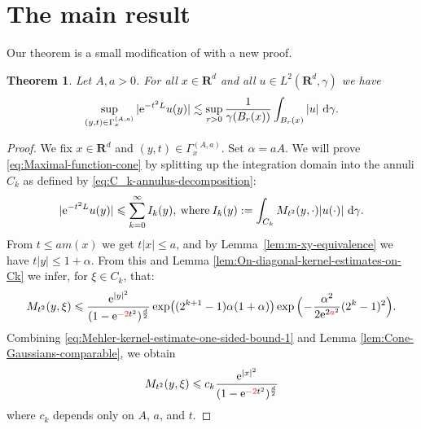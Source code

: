 \documentclass{amsart}
\newtheorem{theorem}{Theorem}
\theoremstyle{remark}
\newcommand{\D}{\,\textup{d}}
\newcommand{\LHG}{{L^2(\R^d,\gamma)}}
\renewcommand{\leq}{\leqslant}
\renewcommand{\leq}{\leqslant}
\newcommand{\R}{\mathbf R}
\newcommand{\e}{\mathrm{e}} %
\renewcommand{\leq}{\leqslant}%
\newcommand{\red}{\color{red}}
\begin{document}
\section{The main result}
Our theorem is a small modification of \cite[lemma 1.1]{Pineda2008} with a new proof.
\begin{theorem}\label{thm:Gaussian-maximal-function}
  Let $A, a > 0$. For all $x\in \R^d$ and all $u \in \LHG$ we have
  \begin{equation}
    \label{eq:Maximal-function-cone}
    \sup_{(y, t) \in \Gamma_x^{(A, a)}} |\e^{-t^2 L} u(y)| \lesssim
    \sup_{r > 0} \frac1{\gamma(B_r(x))}\int_{B_r(x)} |u| \, \D\gamma.
  \end{equation}
\end{theorem}
\begin{proof}
  We fix $x\in \R^d$ and $ (y, t) \in \Gamma_x^{(A, a)}$. 
  Set $\alpha = aA$. 
  We will prove \eqref{eq:Maximal-function-cone} by splitting up the
  integration domain into the annuli $C_k$ as defined by
  \eqref{eq:C_k-annulus-decomposition}: 
  \begin{equation}
    \label{eq:Maximal-function-cone-intermediate-step-1}
    |\e^{-t^2 L} u(y)| \leq \sum_{k = 0}^\infty I_k(y),
    \:\text{where}\: I_k(y) := \int_{C_k} M_{t^2}(y, \cdot) |u(\cdot)|
    \,\D\gamma.
  \end{equation} 
  From $t \leq a m(x)$ we get $t |x| \leq a$, and by
  Lemma~\ref{lem:m-xy-equivalence} we have $t |y| \leq 1 + \alpha$. From this
  and Lemma \ref{lem:On-diagonal-kernel-estimates-on-Ck} we infer, for $\xi\in
  C_k$, that:
  \begin{equation}
    \label{eq:Mehler-kernel-estimate-one-sided-bound-1}
    M_{t^2}(y, \xi) \leq  \frac{\e^{|y|^2}}{(1 -
      \e^{-{\red 2}{t^2}})^{\frac{d}2}} \exp\bigl((2^{k + 1} - 1) \alpha (1 + \alpha) \bigr)
    \exp\Big(\!-\!\frac{\alpha^2}{2 \e^{2{\red a}^2}} (2^k - 1)^2 \Big).
  \end{equation}
  Combining \eqref{eq:Mehler-kernel-estimate-one-sided-bound-1} and Lemma \ref{lem:Cone-Gaussians-comparable}, we obtain
  $$  M_{t^2}(y, \xi) \leq  c_k\frac{\e^{|x|^2}}{(1 - \e^{-{\red 2}{t^2}})^{\frac{d}2}}
  $$       
  where $c_k$ depends only on $A$, $a$, and $t$.

\end{proof}
\end{document}
